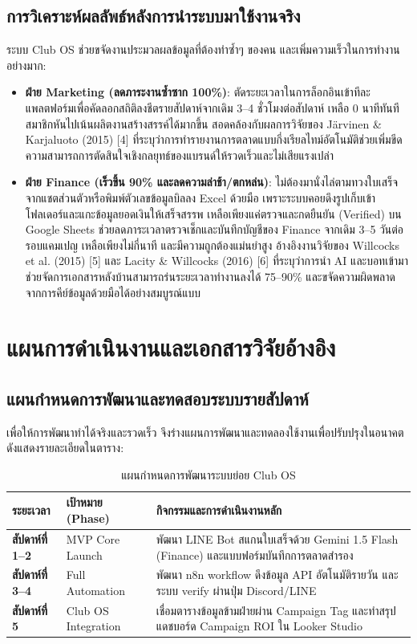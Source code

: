 \documentclass[10pt,a4paper]{article}
\begin{document}
\subsection{การวิเคราะห์ผลลัพธ์หลังการนำระบบมาใช้งานจริง}
ระบบ Club OS ช่วยขจัดงานประมวลผลข้อมูลที่ต้องทำซ้ำๆ ของคน และเพิ่มความเร็วในการทำงานอย่างมาก:
\begin{itemize}
  \item \textbf{ฝ่าย Marketing (ลดภาระงานซ้ำซาก 100\%)}: ตัดระยะเวลาในการล็อกอินเข้าทีละแพลตฟอร์มเพื่อคัดลอกสถิติลงชีตรายสัปดาห์จากเดิม 3--4 ชั่วโมงต่อสัปดาห์ เหลือ 0 นาทีทันที สมาชิกหันไปเน้นผลิตงานสร้างสรรค์ได้มากขึ้น สอดคล้องกับผลการวิจัยของ Järvinen \& Karjaluoto (2015) [4] ที่ระบุว่าการทำรายงานการตลาดแบบกึ่งเรียลไทม์อัตโนมัติช่วยเพิ่มขีดความสามารถการตัดสินใจเชิงกลยุทธ์ของแบรนด์ให้รวดเร็วและไม่เสียแรงเปล่า
  \item \textbf{ฝ่าย Finance (เร็วขึ้น 90\% และลดความล่าช้า/ตกหล่น)}: ไม่ต้องมานั่งไล่ตามทวงใบเสร็จจากแชตส่วนตัวหรือพิมพ์ตัวเลขข้อมูลบิลลง Excel ด้วยมือ เพราะระบบคอยดึงรูปเก็บเข้าโฟลเดอร์และแกะข้อมูลยอดเงินให้เสร็จสรรพ เหลือเพียงแค่ตรวจและกดยืนยัน (Verified) บน Google Sheets ช่วยลดภาระเวลาตรวจเช็กและบันทึกบัญชีของ Finance จากเดิม 3--5 วันต่อรอบแคมเปญ เหลือเพียงไม่กี่นาที และมีความถูกต้องแม่นยำสูง อ้างอิงงานวิจัยของ Willcocks et al. (2015) [5] และ Lacity \& Willcocks (2016) [6] ที่ระบุว่าการนำ AI และบอทเข้ามาช่วยจัดการเอกสารหลังบ้านสามารถร่นระยะเวลาทำงานลงได้ 75--90\% และขจัดความผิดพลาดจากการคีย์ข้อมูลด้วยมือได้อย่างสมบูรณ์แบบ
\end{itemize}

\newpage

\section{แผนการดำเนินงานและเอกสารวิจัยอ้างอิง}

\subsection{แผนกำหนดการพัฒนาและทดสอบระบบรายสัปดาห์}
เพื่อให้การพัฒนาทำได้จริงและรวดเร็ว จึงร่างแผนการพัฒนาและทดลองใช้งานเพื่อปรับปรุงในอนาคต ดังแสดงรายละเอียดในตาราง:

\begin{table}[h!]
  \centering
  \caption{\chulafont แผนกำหนดการพัฒนาระบบย่อย Club OS}
  \begin{tabular}{llp{11.0cm}}
    \toprule
    \textbf{ระยะเวลา} & \textbf{เป้าหมาย (Phase)} & \textbf{กิจกรรมและการดำเนินงานหลัก} \\
    \midrule
    \textbf{สัปดาห์ที่ 1--2} & MVP Core Launch & พัฒนา LINE Bot สแกนใบเสร็จด้วย Gemini 1.5 Flash (Finance) และแบบฟอร์มบันทึกการตลาดสำรอง \\
    \textbf{สัปดาห์ที่ 3--4} & Full Automation & พัฒนา n8n workflow ดึงข้อมูล API อัตโนมัติรายวัน และระบบ verify ผ่านปุ่ม Discord/LINE \\
    \textbf{สัปดาห์ที่ 5} & Club OS Integration & เชื่อมตารางข้อมูลข้ามฝ่ายผ่าน Campaign Tag และทำสรุปแดชบอร์ด Campaign ROI ใน Looker Studio \\
    \bottomrule
  \end{tabular}
\end{table}
\end{document}
